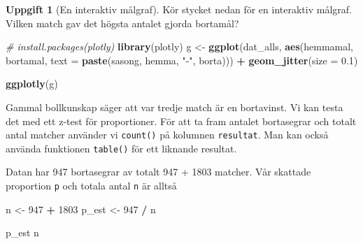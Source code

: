 \documentclass[
]{book}
\newenvironment{Shaded}{\begin{snugshade}}{\end{snugshade}}
\newcommand{\AttributeTok}[1]{\textcolor[rgb]{0.13,0.29,0.53}{#1}}
\newcommand{\CommentTok}[1]{\textcolor[rgb]{0.56,0.35,0.01}{\textit{#1}}}
\newcommand{\DecValTok}[1]{\textcolor[rgb]{0.00,0.00,0.81}{#1}}
\newcommand{\FloatTok}[1]{\textcolor[rgb]{0.00,0.00,0.81}{#1}}
\newcommand{\FunctionTok}[1]{\textcolor[rgb]{0.13,0.29,0.53}{\textbf{#1}}}
\newcommand{\NormalTok}[1]{#1}
\newcommand{\OtherTok}[1]{\textcolor[rgb]{0.56,0.35,0.01}{#1}}
\newcommand{\SpecialCharTok}[1]{\textcolor[rgb]{0.81,0.36,0.00}{\textbf{#1}}}
\newcommand{\StringTok}[1]{\textcolor[rgb]{0.31,0.60,0.02}{#1}}
\theoremstyle{definition}
\theoremstyle{definition}
\theoremstyle{definition}
\newtheorem{exercise}{Uppgift}[chapter]
\theoremstyle{definition}
\theoremstyle{remark}
\begin{document}
\begin{exercise}[En interaktiv målgraf]

Kör stycket nedan för en interaktiv målgraf. Vilken match gav det högsta antalet gjorda bortamål?

\begin{Shaded}
\begin{Highlighting}[]
\CommentTok{\# install.packages(plotly)}
\FunctionTok{library}\NormalTok{(plotly)}
\NormalTok{g }\OtherTok{\textless{}{-}} \FunctionTok{ggplot}\NormalTok{(dat\_alls, }\FunctionTok{aes}\NormalTok{(hemmamal, bortamal, }
                      \AttributeTok{text =} \FunctionTok{paste}\NormalTok{(sasong, hemma, }\StringTok{"{-}"}\NormalTok{, borta))) }\SpecialCharTok{+}
  \FunctionTok{geom\_jitter}\NormalTok{(}\AttributeTok{size =} \FloatTok{0.1}\NormalTok{)}

\FunctionTok{ggplotly}\NormalTok{(g)}
\end{Highlighting}
\end{Shaded}

\end{exercise}

Gammal bollkunskap säger att var tredje match är en bortavinst. Vi kan testa det med ett z-test för proportioner. För att ta fram antalet bortasegrar och totalt antal matcher använder vi \texttt{count()} på kolumnen \texttt{resultat}. Man kan också använda funktionen \texttt{table()} för ett liknande resultat.

\begin{Shaded}
\end{Shaded}

Datan har 947 bortasegrar av totalt 947 + 1803 matcher. Vår skattade proportion \texttt{p} och totala antal \texttt{n} är alltså

\begin{Shaded}
\begin{Highlighting}[]
\NormalTok{n }\OtherTok{\textless{}{-}} \DecValTok{947} \SpecialCharTok{+} \DecValTok{1803}
\NormalTok{p\_est }\OtherTok{\textless{}{-}} \DecValTok{947} \SpecialCharTok{/}\NormalTok{ n}

\NormalTok{p\_est}
\NormalTok{n}
\end{Highlighting}
\end{Shaded}
\end{document}
